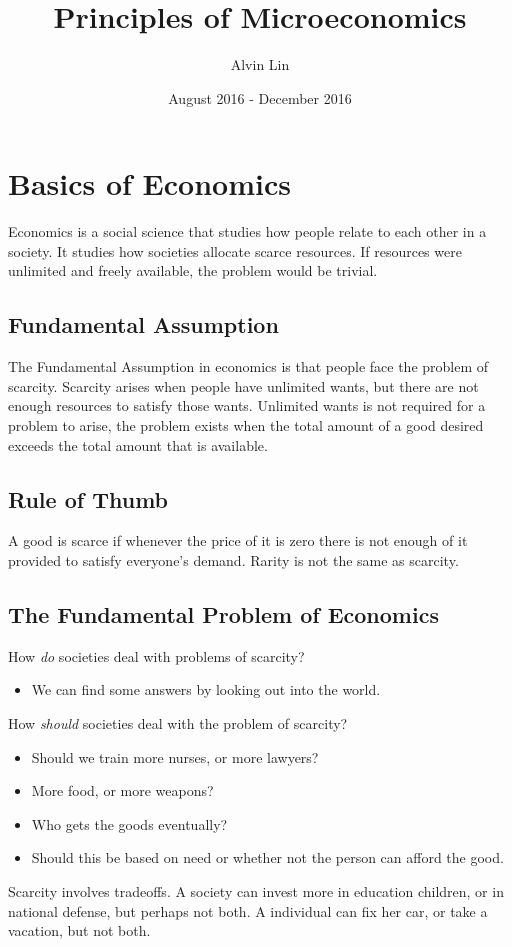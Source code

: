 \documentclass[letterpaper, 12pt]{article}
\title{Principles of Microeconomics}
\author{Alvin Lin}
\date{August 2016 - December 2016}
\begin{document}
\maketitle

\tableofcontents

\section{Basics of Economics}
Economics is a social science that studies how people relate to each other in
a society. It studies how societies allocate scarce resources. If resources were
unlimited and freely available, the problem would be trivial.

\subsection{Fundamental Assumption}
The Fundamental Assumption in economics is that people face the problem
of scarcity. Scarcity arises when people have unlimited wants, but there are not
enough resources to satisfy those wants. Unlimited wants is not required for
a problem to arise, the problem exists when the total amount of a good desired
exceeds the total amount that is available.

\subsection{Rule of Thumb}
A good is scarce if whenever the price of it is zero there is not enough of it
provided to satisfy everyone's demand. Rarity is not the same as scarcity.

\subsection{The Fundamental Problem of Economics}
How \textit{do} societies deal with problems of scarcity?
\begin{itemize}
  \item We can find some answers by looking out into the world.
\end{itemize}
How \textit{should} societies deal with the problem of scarcity?
\begin{itemize}
  \item Should we train more nurses, or more lawyers?
  \item More food, or more weapons?
  \item Who gets the goods eventually?
  \item Should this be based on need or whether not the person can afford the
        good.
\end{itemize}
Scarcity involves tradeoffs. A society can invest more in education children,
or in national defense, but perhaps not both. A individual can fix her car, or
take a vacation, but not both.
\end{document}
